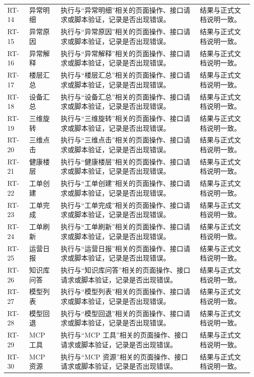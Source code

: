 \documentclass[12pt,a4paper]{ctexart}
\begin{document}
\begin{longtable}{L{1.8cm}L{3.2cm}L{6.4cm}L{4.0cm}}
RT-14 & 异常明细 & 执行与“异常明细”相关的页面操作、接口请求或脚本验证，记录是否出现错误。 & 结果与正式文档说明一致。 \\
RT-15 & 异常原因 & 执行与“异常原因”相关的页面操作、接口请求或脚本验证，记录是否出现错误。 & 结果与正式文档说明一致。 \\
RT-16 & 异常解释 & 执行与“异常解释”相关的页面操作、接口请求或脚本验证，记录是否出现错误。 & 结果与正式文档说明一致。 \\
RT-17 & 楼层汇总 & 执行与“楼层汇总”相关的页面操作、接口请求或脚本验证，记录是否出现错误。 & 结果与正式文档说明一致。 \\
RT-18 & 设备汇总 & 执行与“设备汇总”相关的页面操作、接口请求或脚本验证，记录是否出现错误。 & 结果与正式文档说明一致。 \\
RT-19 & 三维旋转 & 执行与“三维旋转”相关的页面操作、接口请求或脚本验证，记录是否出现错误。 & 结果与正式文档说明一致。 \\
RT-20 & 三维点击 & 执行与“三维点击”相关的页面操作、接口请求或脚本验证，记录是否出现错误。 & 结果与正式文档说明一致。 \\
RT-21 & 健康楼层 & 执行与“健康楼层”相关的页面操作、接口请求或脚本验证，记录是否出现错误。 & 结果与正式文档说明一致。 \\
RT-22 & 工单创建 & 执行与“工单创建”相关的页面操作、接口请求或脚本验证，记录是否出现错误。 & 结果与正式文档说明一致。 \\
RT-23 & 工单完成 & 执行与“工单完成”相关的页面操作、接口请求或脚本验证，记录是否出现错误。 & 结果与正式文档说明一致。 \\
RT-24 & 工单刷新 & 执行与“工单刷新”相关的页面操作、接口请求或脚本验证，记录是否出现错误。 & 结果与正式文档说明一致。 \\
RT-25 & 运营日报 & 执行与“运营日报”相关的页面操作、接口请求或脚本验证，记录是否出现错误。 & 结果与正式文档说明一致。 \\
RT-26 & 知识库问答 & 执行与“知识库问答”相关的页面操作、接口请求或脚本验证，记录是否出现错误。 & 结果与正式文档说明一致。 \\
RT-27 & 模型列表 & 执行与“模型列表”相关的页面操作、接口请求或脚本验证，记录是否出现错误。 & 结果与正式文档说明一致。 \\
RT-28 & 模型回退 & 执行与“模型回退”相关的页面操作、接口请求或脚本验证，记录是否出现错误。 & 结果与正式文档说明一致。 \\
RT-29 & MCP 工具 & 执行与“MCP 工具”相关的页面操作、接口请求或脚本验证，记录是否出现错误。 & 结果与正式文档说明一致。 \\
RT-30 & MCP 资源 & 执行与“MCP 资源”相关的页面操作、接口请求或脚本验证，记录是否出现错误。 & 结果与正式文档说明一致。 \\

\end{longtable}
\end{document}

